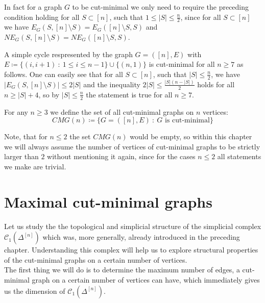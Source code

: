 \begin{rem}\label{remark1}
In fact for a graph \(G\) to be cut-minimal we only need to require the preceding condition holding for all \(S\subset [n]\), such that \(1\leq|S|\leq\frac{n}{2}\), since for all \(S\subset [n]\) we have \(E_G(S,[n]\setminus S)=E_G([n]\setminus S,S)\) and \(NE_G(S,[n]\setminus S)=NE_G([n]\setminus S,S)\).
\end{rem}

\begin{expl}
A simple cycle respresented by the graph \(G=([n],E)\) with\\
\(E\coloneqq \{(i,i+1)\: :\: 1\leq i\leq n-1\}\cup\{(n,1)\}\) is cut-minimal for all \(n\geq 7\) as follows. One can easily see that for all \(S\subset [n]\), such that \(|S|\leq\frac{n}{2}\), we have \(|E_G(S,[n]\setminus S)|\leq 2|S|\) and the inequality \(2|S|\leq\frac{|S|(n-|S|)}{2}\) holds for all \(n\geq |S|+4\), so by \(|S|\leq\frac{n}{2}\) the statement is true for all \(n\geq 7\).
\end{expl}

\begin{defi}
For any \(n\geq 3\) we define the set of all cut-minimal graphs on \(n\) vertices:
\[
CMG(n)\coloneqq \{G=([n],E)\: :\: G\text{ is cut-minimal}\}
\]
\end{defi}

Note, that for \(n\leq 2\) the set \(CMG(n)\) would be empty, so within this chapter we will always assume the number of vertices of cut-minimal graphs to be strictly larger than \(2\) without mentioning it again, since for the cases \(n\leq 2\) all statements we make are trivial.

\section{Maximal cut-minimal graphs}

Let us study the the topological and simplicial structure of the simplicial complex \(\mathcal{C}_1(\Delta^{[n]})\) which was, more generally, already introduced in the preceding chapter. Understanding this complex will help us to explore structural properties of the cut-minimal graphs on a certain number of vertices.\\
The first thing we will do is to determine the maximum number of edges, a cut-minimal graph on a certain number of vertices can have, which immediately gives us the dimension of \(\mathcal{C}_1(\Delta^{[n]})\).

